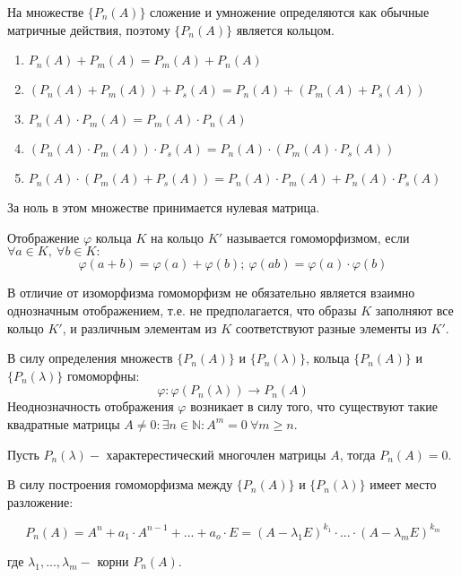 На множестве $\{P_n(A)\}$ сложение и умножение определяются как обычные матричные действия, поэтому $\{P_n(A)\}$ является кольцом.

\begin{enumerate}
	\item $P_n(A) + P_m(A) = P_m(A) + P_n(A)$
	\item $(P_n(A) + P_m(A)) + P_s(A) = P_n(A) + (P_m(A) + P_s(A))$
	\item $P_n(A) \cdot P_m(A) = P_m(A) \cdot P_n(A)$
	\item $(P_n(A) \cdot P_m(A)) \cdot P_s(A) = P_n(A) \cdot (P_m(A) \cdot P_s(A))$
	\item $P_n(A) \cdot (P_m(A) + P_s(A)) = P_n(A) \cdot P_m(A) + P_n(A) \cdot P_s(A)$
\end{enumerate}

За ноль в этом множестве принимается нулевая матрица.

\begin{definition}
Отображение $\varphi$ кольца $K$ на кольцо $K'$ называется гомоморфизмом, если $\forall a \in K,~ \forall b \in K:$
\[\varphi(a+b) = \varphi(a) + \varphi(b);~ \varphi(ab) = \varphi(a) \cdot \varphi(b)\] 
\end{definition}

В отличие от изоморфизма гомоморфизм не обязательно является взаимно однозначным отображением, т.е. не предполагается, что образы $K$ заполняют все кольцо $K'$, и различным элементам из $K$ соответствуют разные элементы из $K'$.

В силу определения множеств $\{P_n(A)\}$ и $\{P_n(\lambda)\}$, кольца $\{P_n(A)\}$ и $\{P_n(\lambda)\}$ гомоморфны:
\[\varphi: \varphi(P_n(\lambda)) \longrightarrow P_n(A)\]
Неоднозначность отображения $\varphi$ возникает в силу того, что существуют такие квадратные матрицы $A \neq 0: \exists n \in \mathbb {N}: A^m = 0~ \forall m \geq n$.

\begin{theorem}
Пусть $P_n(\lambda) - $ характерестический многочлен матрицы $A$, тогда $P_n(A) = 0$.
\end{theorem}

В силу построения гомоморфизма между $\{P_n(A)\}$ и $\{P_n(\lambda)\}$ имеет место разложение:

\[P_n(A) = A^n + a_1 \cdot A^{n-1} + ... + a_o \cdot E = (A - \lambda_1 E)^{k_1} \cdot ... \cdot (A - \lambda_m E)^{k_m}\]

где $\lambda_1, ..., \lambda_m - $ корни $P_n(A)$.

